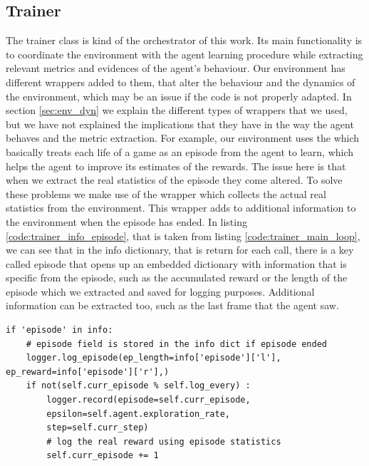 \subsection{Trainer}
The trainer class is kind of the orchestrator of this work. Its main functionality is to coordinate the environment with the agent learning procedure while extracting relevant metrics and evidences of the agent's behaviour. Our environment has different wrappers added to them, that alter the behaviour and the dynamics of the environment, which may be an issue if the code is not properly adapted. In section \ref{sec:env_dyn} we explain the different types of wrappers that we used, but we have not explained the implications that they have in the way the agent behaves and the metric extraction. For example, our environment uses the  which basically treats each life of a game as an episode from the agent to learn, which helps the agent to improve its estimates of the rewards. The issue here is that when we extract the real statistics of the episode they come altered. To solve these problems we make use of the wrapper  which collects the actual real statistics from the environment. This wrapper adds to additional information to the environment when the episode has ended. In listing \ref{code:trainer_info_episode}, that is taken from listing \ref{code:trainer_main_loop}, we can see that in the info dictionary, that is return for each  call, there is a key called episode that opens up an embedded dictionary with information that is specific from the episode, such as the accumulated reward or the length of the episode which we extracted and saved for logging purposes. Additional information can be extracted too, such as the last frame that the agent saw.

\begin{lstlisting}[caption={Episodic information retrival from \inlinecode{RecordEpisodeStatistics} wrapper}, label={code:trainer_info_episode}]
if 'episode' in info:
	# episode field is stored in the info dict if episode ended
	logger.log_episode(ep_length=info['episode']['l'], ep_reward=info['episode']['r'],)
	if not(self.curr_episode % self.log_every) :
		logger.record(episode=self.curr_episode, 
		epsilon=self.agent.exploration_rate, 
		step=self.curr_step)
		# log the real reward using episode statistics
		self.curr_episode += 1
\end{lstlisting}

